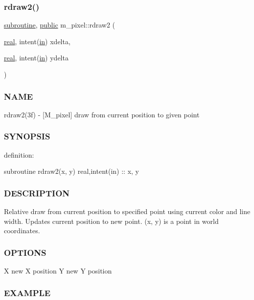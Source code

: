 \subsubsection{\texorpdfstring{rdraw2()}{rdraw2()}}
{\footnotesize\ttfamily \hyperlink{M__stopwatch_83_8txt_acfbcff50169d691ff02d4a123ed70482}{subroutine}, \hyperlink{M__stopwatch_83_8txt_a2f74811300c361e53b430611a7d1769f}{public} m\+\_\+pixel\+::rdraw2 (\begin{DoxyParamCaption}\item[{\hyperlink{read__watch_83_8txt_abdb62bde002f38ef75f810d3a905a823}{real}, intent(\hyperlink{M__journal_83_8txt_afce72651d1eed785a2132bee863b2f38}{in})}]{xdelta,  }\item[{\hyperlink{read__watch_83_8txt_abdb62bde002f38ef75f810d3a905a823}{real}, intent(\hyperlink{M__journal_83_8txt_afce72651d1eed785a2132bee863b2f38}{in})}]{ydelta }\end{DoxyParamCaption})}



\subsubsection*{N\+A\+ME}

rdraw2(3f) -\/ \mbox{[}M\+\_\+pixel\mbox{]} draw from current position to given point 

\subsubsection*{S\+Y\+N\+O\+P\+S\+IS}

definition\+:

subroutine rdraw2(x, y) real,intent(in) \+:\+: x, y

\subsubsection*{D\+E\+S\+C\+R\+I\+P\+T\+I\+ON}

Relative draw from current position to specified point using current color and line width. Updates current position to new point. (x, y) is a point in world coordinates.

\subsubsection*{O\+P\+T\+I\+O\+NS}

X new X position Y new Y position

\subsubsection*{E\+X\+A\+M\+P\+LE}


